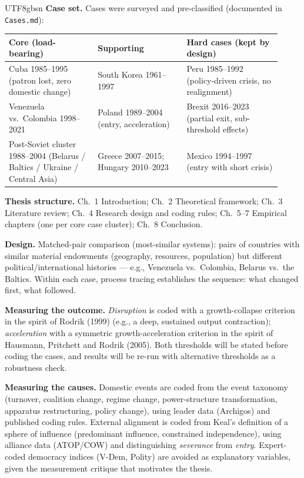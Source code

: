 \documentclass[10pt]{article}
\begin{document}
\begin{CJK}{UTF8}{gbsn}
\noindent\textbf{Case set.} Cases were surveyed and pre-classified (documented in \texttt{Cases.md}):

\begin{center}\small
\begin{tabular}{p{0.30\linewidth} p{0.30\linewidth} p{0.32\linewidth}}
\toprule
\textbf{Core (load-bearing)} & \textbf{Supporting} & \textbf{Hard cases (kept by design)} \\
\midrule
Cuba 1985--1995 (patron lost, zero domestic change) & South Korea 1961--1997 & Peru 1985--1992 (policy-driven crisis, no realignment) \\
Venezuela vs.\ Colombia 1998--2021 & Poland 1989--2004 (entry, acceleration) & Brexit 2016--2023 (partial exit, sub-threshold effects) \\
Post-Soviet cluster 1988--2004 (Belarus / Baltics / Ukraine / Central Asia) & Greece 2007--2015; Hungary 2010--2023 & Mexico 1994--1997 (entry with short crisis) \\
\bottomrule
\end{tabular}
\end{center}

\noindent\textbf{Thesis structure.} Ch.~1 Introduction; Ch.~2 Theoretical framework; Ch.~3 Literature review; Ch.~4 Research design and coding rules; Ch.~5--7 Empirical chapters (one per core case cluster); Ch.~8 Conclusion.

\newpage


\vspace{6pt}
\noindent\textbf{Design.} Matched-pair comparison (most-similar systems): pairs of countries with similar material endowments (geography, resources, population) but different political/international histories --- e.g., Venezuela vs.\ Colombia, Belarus vs.\ the Baltics. Within each case, process tracing establishes the sequence: what changed first, what followed.

\noindent\textbf{Measuring the outcome.} \emph{Disruption} is coded with a growth-collapse criterion in the spirit of Rodrik (1999) (e.g., a deep, sustained output contraction); \emph{acceleration} with a symmetric growth-acceleration criterion in the spirit of Hausmann, Pritchett and Rodrik (2005). Both thresholds will be stated before coding the cases, and results will be re-run with alternative thresholds as a robustness check.

\noindent\textbf{Measuring the causes.} Domestic events are coded from the event taxonomy (turnover, coalition change, regime change, power-structure transformation, apparatus restructuring, policy change), using leader data (Archigos) and published coding rules. External alignment is coded from Keal's definition of a sphere of influence (predominant influence, constrained independence), using alliance data (ATOP/COW) and distinguishing \emph{severance} from \emph{entry}. Expert-coded democracy indices (V-Dem, Polity) are avoided as explanatory variables, given the measurement critique that motivates the thesis.


\end{CJK}
\end{document}
